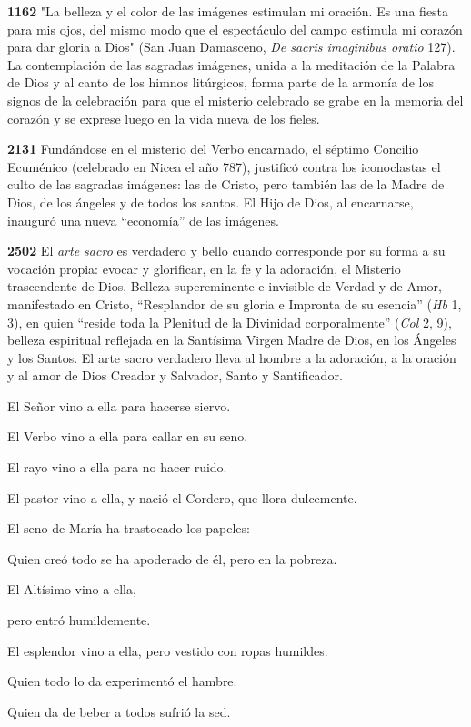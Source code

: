 \documentclass[]{article}
\begin{document}
\textbf{1162} "La belleza y el color de las imágenes estimulan mi
oración. Es una fiesta para mis ojos, del mismo modo que el espectáculo
del campo estimula mi corazón para dar gloria a Dios" (San Juan
Damasceno, \emph{De sacris imaginibus oratio} 127). La contemplación de
las sagradas imágenes, unida a la meditación de la Palabra de Dios y al
canto de los himnos litúrgicos, forma parte de la armonía de los signos
de la celebración para que el misterio celebrado se grabe en la memoria
del corazón y se exprese luego en la vida nueva de los fieles.

\textbf{2131} Fundándose en el misterio del Verbo encarnado, el séptimo
Concilio Ecuménico (celebrado en Nicea el año 787), justificó contra los
iconoclastas el culto de las sagradas imágenes: las de Cristo, pero
también las de la Madre de Dios, de los ángeles y de todos los santos.
El Hijo de Dios, al encarnarse, inauguró una nueva ``economía'' de las
imágenes.

\textbf{2502} El \emph{arte sacro} es verdadero y bello cuando
corresponde por su forma a su vocación propia: evocar y glorificar, en
la fe y la adoración, el Misterio trascendente de Dios, Belleza
supereminente e invisible de Verdad y de Amor, manifestado en Cristo,
``Resplandor de su gloria e Impronta de su esencia'' (\emph{Hb} 1, 3),
en quien ``reside toda la Plenitud de la Divinidad corporalmente''
(\emph{Col} 2, 9), belleza espiritual reflejada en la Santísima Virgen
Madre de Dios, en los Ángeles y los Santos. El arte sacro verdadero
lleva al hombre a la adoración, a la oración y al amor de Dios Creador y
Salvador, Santo y Santificador.

El Señor vino a ella para hacerse siervo.

El Verbo vino a ella para callar en su seno.

El rayo vino a ella para no hacer ruido.

El pastor vino a ella, y nació el Cordero, que llora dulcemente.

El seno de María ha trastocado los papeles:

Quien creó todo se ha apoderado de él, pero en la pobreza.

El Altísimo vino a ella,

pero entró humildemente.

El esplendor vino a ella, pero vestido con ropas humildes.

Quien todo lo da experimentó el hambre.

Quien da de beber a todos sufrió la sed.
\end{document}
